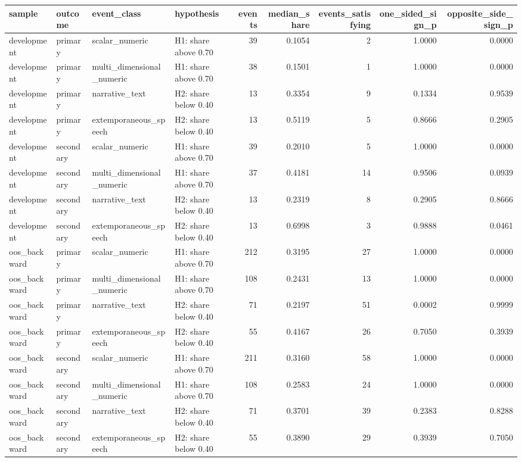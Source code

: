 \begin{tabular}{llllrrrrr}
\toprule
sample & outcome & event_class & hypothesis & events & median_share & events_satisfying & one_sided_sign_p & opposite_side_sign_p \\
\midrule
development & primary & scalar_numeric & H1: share above 0.70 & 39 & 0.1054 & 2 & 1.0000 & 0.0000 \\
development & primary & multi_dimensional_numeric & H1: share above 0.70 & 38 & 0.1501 & 1 & 1.0000 & 0.0000 \\
development & primary & narrative_text & H2: share below 0.40 & 13 & 0.3354 & 9 & 0.1334 & 0.9539 \\
development & primary & extemporaneous_speech & H2: share below 0.40 & 13 & 0.5119 & 5 & 0.8666 & 0.2905 \\
development & secondary & scalar_numeric & H1: share above 0.70 & 39 & 0.2010 & 5 & 1.0000 & 0.0000 \\
development & secondary & multi_dimensional_numeric & H1: share above 0.70 & 37 & 0.4181 & 14 & 0.9506 & 0.0939 \\
development & secondary & narrative_text & H2: share below 0.40 & 13 & 0.2319 & 8 & 0.2905 & 0.8666 \\
development & secondary & extemporaneous_speech & H2: share below 0.40 & 13 & 0.6998 & 3 & 0.9888 & 0.0461 \\
oos_backward & primary & scalar_numeric & H1: share above 0.70 & 212 & 0.3195 & 27 & 1.0000 & 0.0000 \\
oos_backward & primary & multi_dimensional_numeric & H1: share above 0.70 & 108 & 0.2431 & 13 & 1.0000 & 0.0000 \\
oos_backward & primary & narrative_text & H2: share below 0.40 & 71 & 0.2197 & 51 & 0.0002 & 0.9999 \\
oos_backward & primary & extemporaneous_speech & H2: share below 0.40 & 55 & 0.4167 & 26 & 0.7050 & 0.3939 \\
oos_backward & secondary & scalar_numeric & H1: share above 0.70 & 211 & 0.3160 & 58 & 1.0000 & 0.0000 \\
oos_backward & secondary & multi_dimensional_numeric & H1: share above 0.70 & 108 & 0.2583 & 24 & 1.0000 & 0.0000 \\
oos_backward & secondary & narrative_text & H2: share below 0.40 & 71 & 0.3701 & 39 & 0.2383 & 0.8288 \\
oos_backward & secondary & extemporaneous_speech & H2: share below 0.40 & 55 & 0.3890 & 29 & 0.3939 & 0.7050 \\

\end{tabular}
